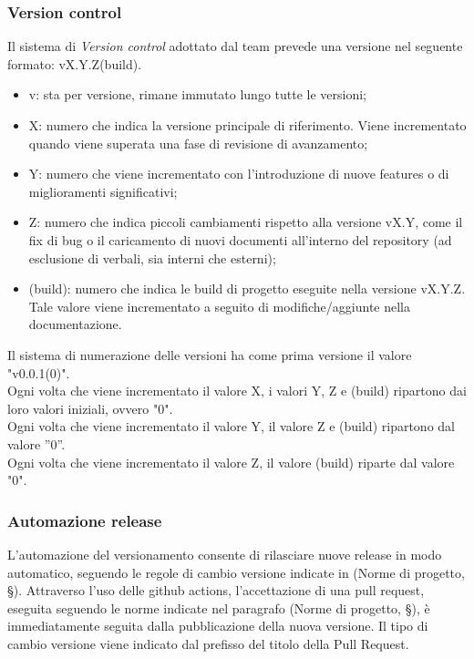 \documentclass[10pt, a4paper]{article}
\begin{document}
\subsubsection{Version control}
\label{sec:version}
Il sistema di \textit{Version control} adottato dal team prevede una versione nel seguente formato: vX.Y.Z(build).
\begin{itemize}
    \item v: sta per versione, rimane immutato lungo tutte le versioni;
    \item X: numero che indica la versione principale di riferimento. Viene incrementato quando viene superata una fase di revisione di avanzamento;
    \item Y: numero che viene incrementato con l'introduzione di nuove features o di miglioramenti significativi;
    \item Z:  numero che indica piccoli cambiamenti rispetto alla versione vX.Y, come il fix di bug o il caricamento di nuovi documenti all'interno del repository (ad esclusione di verbali, sia interni che esterni);
    \item (build): numero che indica le build di progetto eseguite nella versione vX.Y.Z. Tale valore viene incrementato a seguito di modifiche/aggiunte nella documentazione.
\end{itemize}
Il sistema di numerazione delle versioni ha come prima versione il valore "v0.0.1(0)".\\
Ogni volta che viene incrementato il valore X, i valori Y, Z e (build) ripartono dai loro valori iniziali, ovvero "0".\\
Ogni volta che viene incrementato il valore Y, il valore Z e (build) ripartono dal valore ”0”.\\
Ogni volta che viene incrementato il valore Z, il valore (build) riparte dal valore "0".

\subsubsection{Automazione release}
L'automazione del versionamento consente di rilasciare nuove release in modo automatico, seguendo le regole di
cambio versione indicate in (Norme di progetto, \S {}). Attraverso l'uso delle github actions, l'accettazione di una pull request, eseguita seguendo le norme indicate nel
paragrafo (Norme di progetto, \S {}), è immediatamente seguita dalla pubblicazione della nuova versione.
Il tipo di cambio versione viene indicato dal prefisso del titolo della Pull Request.
\end{document}
